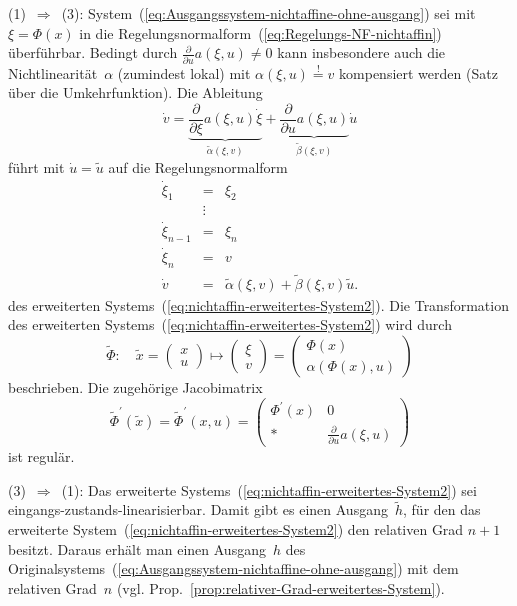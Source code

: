 \begin{svmultproof2}
(1)~$\Rightarrow$~(3): System~(\ref{eq:Ausgangssystem-nichtaffine-ohne-ausgang})
sei mit $\xi=\Phi(x)$ in die Regelungsnormalform~(\ref{eq:Regelungs-NF-nichtaffin})
überführbar. Bedingt durch $\frac{\partial}{\partial u}a(\xi,u)\neq0$
kann insbesondere auch die Nichtlinearität~$\alpha$ (zumindest lokal)
mit $\alpha(\xi,u)\stackrel{!}{=}v$ kompensiert werden (Satz über
die Umkehrfunktion). Die Ableitung 
\[
\dot{v}=\underbrace{\frac{\partial}{\partial\xi}a(\xi,u)\dot{\xi}}_{{\displaystyle \tilde{\alpha}(\xi,v)}}+\underbrace{\frac{\partial}{\partial u}a(\xi,u)}_{{\displaystyle \tilde{\beta}(\xi,v)}}\dot{u}
\]
führt mit $\dot{u}=\tilde{u}$ auf die Regelungsnormalform 
\[
\begin{array}{lcl}
\dot{\xi}_{1} & = & \xi_{2}\\
 & \vdots\\
\dot{\xi}_{n-1} & = & \xi_{n}\\
\dot{\xi}_{n} & = & v\\
\dot{v} & = & \tilde{\alpha}(\xi,v)+\tilde{\beta}(\xi,v)\tilde{u}.
\end{array}
\]
des erweiterten Systems~(\ref{eq:nichtaffin-erweitertes-System2}).
Die Transformation des erweiterten Systems~(\ref{eq:nichtaffin-erweitertes-System2})
wird durch
\[
\tilde{\Phi}:\quad\tilde{x}=\left(\begin{array}{c}
x\\
u
\end{array}\right)\mapsto\left(\begin{array}{c}
\xi\\
v
\end{array}\right)=\left(\begin{array}{c}
\Phi(x)\\
\alpha(\Phi(x),u)
\end{array}\right)
\]
beschrieben. Die zugehörige Jacobimatrix
\[
\tilde{\Phi}^{\prime}(\tilde{x})=\tilde{\Phi}^{\prime}(x,u)=\left(\begin{array}{cc}
\Phi^{\prime}(x) & 0\\
* & \frac{\partial}{\partial u}a(\xi,u)
\end{array}\right)
\]
ist regulär.

(3)~$\Rightarrow$~(1): Das erweiterte Systems~(\ref{eq:nichtaffin-erweitertes-System2})
sei eingangs-zustands-linearisierbar. Damit gibt es einen Ausgang~$\tilde{h}$,
für den das erweiterte System~(\ref{eq:nichtaffin-erweitertes-System2})
den relativen Grad $n+1$ besitzt. Daraus erhält man einen Ausgang~$h$
des Originalsystems~(\ref{eq:Ausgangssystem-nichtaffine-ohne-ausgang})
mit dem relativen Grad~$n$ (vgl. Prop.~\ref{prop:relativer-Grad-erweitertes-System}).
\end{svmultproof2}

